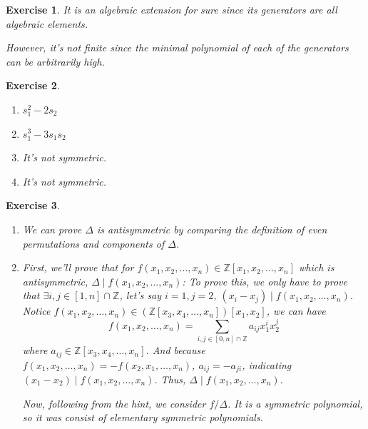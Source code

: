 \documentclass{article}
\theoremstyle{breakstyle}
\newtheorem{exercise}{Exercise}[section]
\begin{document}
\begin{exercise}
    It is an algebraic extension for sure since its generators are all algebraic elements.

    However, it's not finite since the minimal polynomial of each of the generators can be arbitrarily high.
\end{exercise}

\begin{exercise}
    \leavevmode \vspace{-\baselineskip}
    \begin{enumerate}[label=\alph*)]
        \item $s_1^2 - 2s_2$
        \item $s_1^3 - 3s_1s_2$
        \item It's not symmetric.
        \item It's not symmetric.
    \end{enumerate}
\end{exercise}

\begin{exercise}
    \leavevmode \vspace{-\baselineskip}
    \begin{enumerate}[label=\roman*.]
        \item We can prove $\Delta$ is antisymmetric by comparing the definition of even permutations and components of $\Delta$.

        \item First, we'll prove that for $f(x_1, x_2, \ldots, x_n) \in \mathbb{Z}[x_1, x_2, \ldots, x_n]$ which is antisymmetric, $\Delta \mid f(x_1, x_2, \ldots, x_n)$: To prove this, we only have to prove that $\exists i, j \in [1, n] \cap \mathbb{Z}$, let's say $i = 1, j = 2$, $(x_i - x_j) \mid f(x_1, x_2, \ldots, x_n)$. Notice $f(x_1, x_2, \ldots, x_n) \in (\mathbb{Z}[x_3, x_4, \ldots, x_n])[x_1, x_2]$, we can have
            \[ 
                f(x_1, x_2, \ldots, x_n) = \sum_{i, j \in [0, n] \cap \mathbb{Z}} a_{ij} x_1^i x_2^j 
            \]
            where $a_{ij} \in \mathbb{Z}[x_3, x_4, \ldots, x_n]$. And because $f(x_1, x_2, \ldots, x_n) = -f(x_2, x_1, \ldots, x_n)$, $a_{ij} = -a_{ji}$, indicating $(x_1 - x_2) \mid f(x_1, x_2, \ldots, x_n)$. Thus, $\Delta \mid f(x_1, x_2, \ldots, x_n)$.

            Now, following from the hint, we consider $f / \Delta$. It is a symmetric polynomial, so it was consist of elementary symmetric polynomials.
    \end{enumerate}
\end{exercise}
\end{document}
